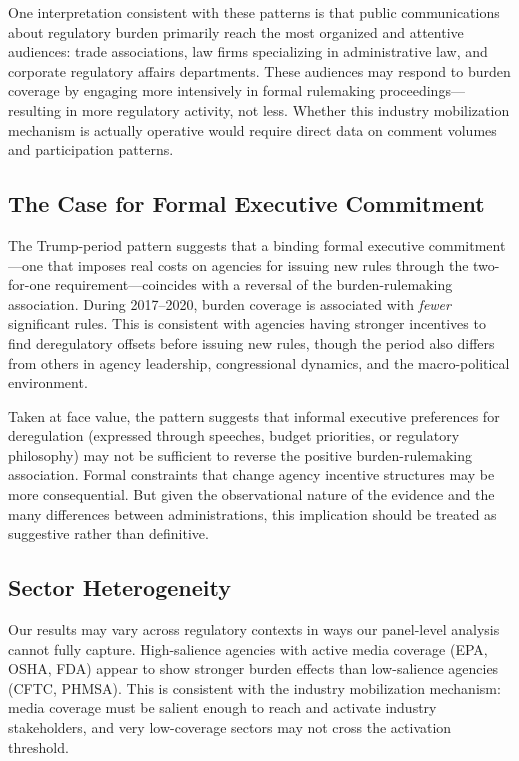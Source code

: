 \documentclass[12pt]{article}
\begin{document}
One interpretation consistent with these patterns is that public communications about regulatory burden primarily reach the most organized and attentive audiences: trade associations, law firms specializing in administrative law, and corporate regulatory affairs departments. These audiences may respond to burden coverage by engaging more intensively in formal rulemaking proceedings---resulting in more regulatory activity, not less. Whether this industry mobilization mechanism is actually operative would require direct data on comment volumes and participation patterns.

\subsection{The Case for Formal Executive Commitment}

The Trump-period pattern suggests that a binding formal executive commitment---one that imposes real costs on agencies for issuing new rules through the two-for-one requirement---coincides with a reversal of the burden-rulemaking association. During 2017--2020, burden coverage is associated with \emph{fewer} significant rules. This is consistent with agencies having stronger incentives to find deregulatory offsets before issuing new rules, though the period also differs from others in agency leadership, congressional dynamics, and the macro-political environment.

Taken at face value, the pattern suggests that informal executive preferences for deregulation (expressed through speeches, budget priorities, or regulatory philosophy) may not be sufficient to reverse the positive burden-rulemaking association. Formal constraints that change agency incentive structures may be more consequential. But given the observational nature of the evidence and the many differences between administrations, this implication should be treated as suggestive rather than definitive.

\subsection{Sector Heterogeneity}

Our results may vary across regulatory contexts in ways our panel-level analysis cannot fully capture. High-salience agencies with active media coverage (EPA, OSHA, FDA) appear to show stronger burden effects than low-salience agencies (CFTC, PHMSA). This is consistent with the industry mobilization mechanism: media coverage must be salient enough to reach and activate industry stakeholders, and very low-coverage sectors may not cross the activation threshold.
\end{document}
